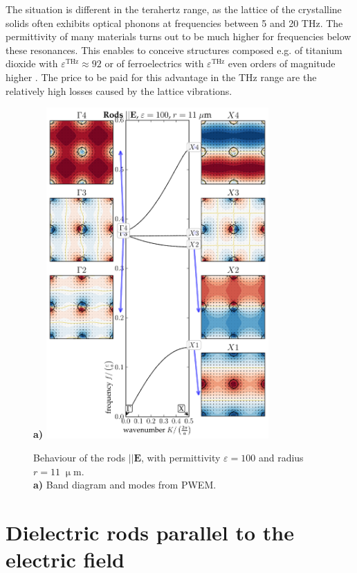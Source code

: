 {The situation is different in the terahertz range, as the lattice of the crystalline solids often exhibits optical phonons at frequencies between 5 and 20 THz. The permittivity of many materials turns out to be much higher for frequencies below these resonances. This enables to conceive structures composed e.g. of titanium dioxide \cite{baumard1977_epsilon_TiO2} with $\varepsilon^{\text{THz}} \approx 92$ or of ferroelectrics with $\varepsilon^{\text{THz}}$ even orders of magnitude higher \cite{skoromets2011tuning}. The price to be paid for this advantage in the THz range are the relatively high losses caused by the lattice vibrations.

\begin{figure}[ht] \caption{Behaviour of the rods $||\mathbf E$, with permittivity $\varepsilon = 100$ and radius $r=11\;\upmu$m.\\
\textbf{a)} Band diagram and modes from PWEM. 
} \label{fg_erod_radius11} \centering 
\textbf{a)}	\includegraphics[width=8.5cm]{img/ERods_eps100_R11_PWEM.pdf}
\end{figure}

}






\section{Dielectric rods parallel to the electric field} %

